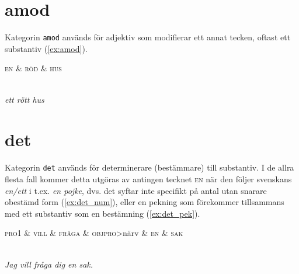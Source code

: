 \documentclass[11pt,a4paper]{article}
\begin{document}

\section{amod}
Kategorin \texttt{amod} används för adjektiv som modifierar ett annat tecken, oftast ett substantiv (\ref{ex:amod}).

\begin{example}
\label{ex:amod}
\begin{dependency}[theme = simple]
   \begin{deptext}[column sep=1em]
      \textsc{en} \& \textsc{röd} \& \textsc{hus} \\
   \end{deptext}
\end{dependency}
\\
\textit{ett rött hus}
\end{example}

\section{det}
Kategorin \texttt{det} används för determinerare (bestämmare) till substantiv. I de allra flesta fall kommer detta utgöras av antingen tecknet \textsc{en} när den följer svenskans \textit{en/ett} i t.ex. \textit{en pojke}, dvs. det syftar inte specifikt på antal utan snarare obestämd form (\ref{ex:det_num}), eller en pekning som förekommer tillsammans med ett substantiv som en bestämning (\ref{ex:det_pek}).

\begin{example}
\label{ex:det_num}
\begin{dependency}[theme = simple]
   \begin{deptext}[column sep=1em]
      \textsc{pro1} \& \textsc{vill} \& \textsc{fråga} \& \textsc{objpro}{\textgreater}närv \& \textsc{en} \& \textsc{sak} \\
   \end{deptext}
\end{dependency}
\\
\textit{Jag vill fråga dig en sak.}
\end{example}
\end{document}
